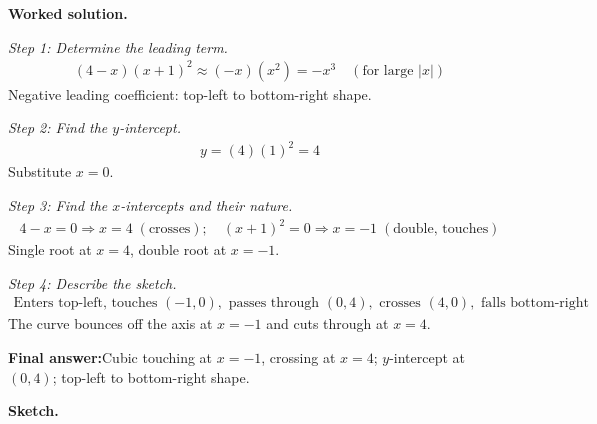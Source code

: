 \documentclass[11pt]{article}
\begin{document}
\textbf{Worked solution.}

\textit{Step 1: Determine the leading term.}
\[\begin{gathered}
(4-x)(x+1)^2 \approx (-x)(x^2) = -x^3 \quad (\text{for large }|x|)
\end{gathered}\]
Negative leading coefficient: top-left to bottom-right shape.

\textit{Step 2: Find the \( y \)-intercept.}
\[\begin{gathered}
y = (4)(1)^2 = 4
\end{gathered}\]
Substitute \( x = 0 \).

\textit{Step 3: Find the \( x \)-intercepts and their nature.}
\[\begin{gathered}
4 - x = 0 \Rightarrow x = 4 \;(\text{crosses}); \quad (x+1)^2 = 0 \Rightarrow x = -1 \;(\text{double, touches})
\end{gathered}\]
Single root at \( x = 4 \), double root at \( x = -1 \).

\textit{Step 4: Describe the sketch.}
\[\begin{gathered}
\text{Enters top-left, touches } (-1,0), \text{ passes through } (0,4), \text{ crosses } (4,0), \text{ falls bottom-right}
\end{gathered}\]
The curve bounces off the axis at \( x = -1 \) and cuts through at \( x = 4 \).

\begin{answerbox}
\textbf{Final answer:}\quad Cubic touching at \(\displaystyle x = -1\), crossing at \(\displaystyle x = 4\); \(\displaystyle y\)-intercept at \(\displaystyle (0, 4)\); top-left to bottom-right shape.
\end{answerbox}
\textbf{Sketch.}
\end{document}
